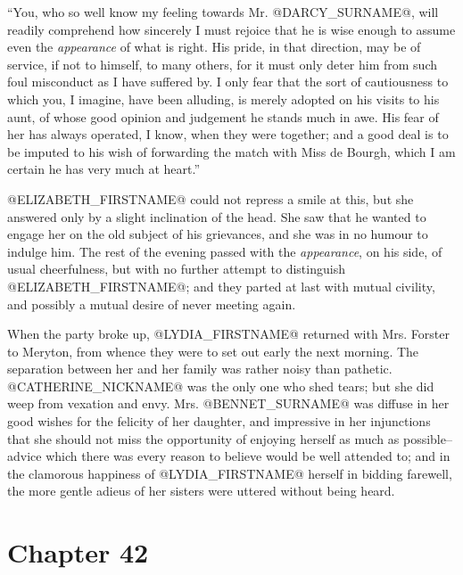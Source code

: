 ``You, who so well know my feeling towards Mr. @DARCY_SURNAME@, will readily
comprehend how sincerely I must rejoice that he is wise enough to assume
even the \textit{appearance} of what is right. His pride, in that direction,
may be of service, if not to himself, to many others, for it must only
deter him from such foul misconduct as I have suffered by. I only
fear that the sort of cautiousness to which you, I imagine, have been
alluding, is merely adopted on his visits to his aunt, of whose good
opinion and judgement he stands much in awe. His fear of her has always
operated, I know, when they were together; and a good deal is to be
imputed to his wish of forwarding the match with Miss de Bourgh, which I
am certain he has very much at heart.''

@ELIZABETH_FIRSTNAME@ could not repress a smile at this, but she answered only by a
slight inclination of the head. She saw that he wanted to engage her on
the old subject of his grievances, and she was in no humour to indulge
him. The rest of the evening passed with the \textit{appearance}, on his
side, of usual cheerfulness, but with no further attempt to distinguish
@ELIZABETH_FIRSTNAME@; and they parted at last with mutual civility, and possibly a
mutual desire of never meeting again.

When the party broke up, @LYDIA_FIRSTNAME@ returned with Mrs. Forster to Meryton,
from whence they were to set out early the next morning. The separation
between her and her family was rather noisy than pathetic. @CATHERINE_NICKNAME@ was the
only one who shed tears; but she did weep from vexation and envy. Mrs.
@BENNET_SURNAME@ was diffuse in her good wishes for the felicity of her daughter,
and impressive in her injunctions that she should not miss the
opportunity of enjoying herself as much as possible--advice which
there was every reason to believe would be well attended to; and in
the clamorous happiness of @LYDIA_FIRSTNAME@ herself in bidding farewell, the more
gentle adieus of her sisters were uttered without being heard.



\chapter*{Chapter 42}


